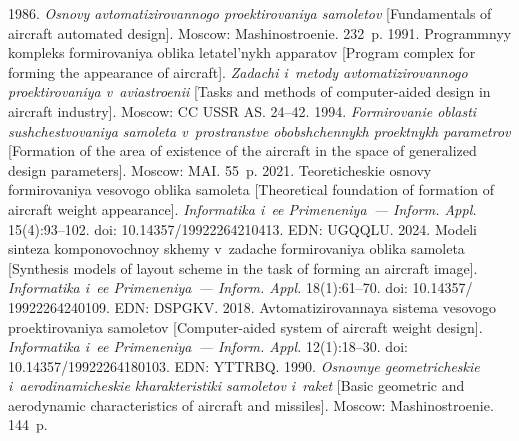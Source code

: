   \begin{multicols}{2}

\renewcommand{\bibname}{\protect\rmfamily References}

{\small\frenchspacing
 {%
 \begin{thebibliography}{99}
       1986. \textit{Osnovy 
avtomatizirovannogo proektirovaniya samoletov} [Fundamentals of aircraft automated design]. 
Moscow: Mashinostroenie. 232~p.
 1991. Programmnyy kompleks 
formirovaniya oblika letatel'nykh apparatov [Program complex for forming the appearance of 
aircraft]. \textit{Zadachi i~metody avtomatizirovannogo proektirovaniya v~aviastroenii} [Tasks 
and methods of computer-aided design in aircraft industry]. Moscow: CC USSR AS. 24--42.
       1994. \textit{Formirovanie oblasti su\-shchest\-vo\-va\-niya samoleta 
v~prostranstve obobshchennykh pro\-ekt\-nykh parametrov} [Formation of the 
area of existence of the aircraft in the space of generalized design parameters]. 
Moscow: MAI. 55~p. 
 2021. Teoreticheskie osno\-vy formirovaniya 
vesovogo oblika samoleta [Theoretical foundation of formation of aircraft weight appearance]. 
\textit{Informatika i~ee Primeneniya~--- Inform. Appl.} 15(4):93--102. doi: 
10.14357/19922264210413. EDN: UGQQLU.
 2024. Modeli sinteza komponovochnoy skhemy 
v~zadache formirovaniya oblika samoleta [Synthesis models of layout scheme in the task of 
forming an aircraft image]. \textit{Informatika i~ee Primeneniya~--- Inform. Appl.} 18(1):61--70. 
doi: 10.14357/ 19922264240109. EDN: DSPGKV.
 2018. Avtomatizirovannaya 
sistema vesovogo proektirovaniya samoletov [Computer-aided system of aircraft weight design]. 
\textit{Informatika i~ee Primeneniya~--- Inform. \mbox{Appl.}} 12(1):18--30. doi: 
10.14357/19922264180103. EDN: \mbox{YTTRBQ}.
       1990. \textit{Osnovnye geometricheskie 
i~aerodinamicheskie kharakteristiki samoletov i~raket} [Basic geometric and aerodynamic 
characteristics of aircraft and missiles]. Moscow: Mashinostroenie. 144~p.

\end{thebibliography}}}
\end{multicols}
